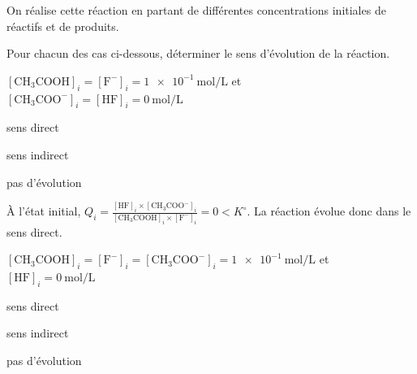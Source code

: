 On réalise cette réaction en partant de différentes concentrations initiales de réactifs et de produits. 

\smallskip
Pour chacun des cas ci-dessous, déterminer le sens d'évolution de la réaction.
\debutEntrainement


\begin{enonce}
$\left[\text{CH}_3\text{COOH}\right]_i=\left[\text{F}^-\right]_i=\SI{1e-1}{\mole\per\liter}$ \qquad et\qquad $\left[\text{CH}_3\text{COO}^-\right]_i=\left[\text{HF}\right]_i=\SI{0}{\mole\per\liter}$
\begin{listeQCM2Colonnes}
	\item sens direct
	\item sens indirect
	\item pas d'évolution
\end{listeQCM2Colonnes}
\end{enonce}

\reponse{\reponseA}

\begin{corrige}
À l'état initial, $Q_i=\frac{\left[\text{HF}\right]_i\times\left[\text{CH}_3\text{COO}^-\right]_i}{\left[\text{CH}_3\text{COOH}\right]_i\times\left[\text{F}^-\right]_i}=0 <K^\circ$. La réaction évolue donc dans le sens direct.
\end{corrige}




\begin{enonce}
$\left[\text{CH}_3\text{COOH}\right]_i=
\left[\text{F}^-\right]_i=
\left[\text{CH}_3\text{COO}^-\right]_i=\SI{1e-1}{\mole\per\liter}$ \qquad et\qquad 
$\left[\text{HF}\right]_i=\SI{0}{\mole\per\liter}$
\begin{listeQCM2Colonnes}
	\item sens direct
	\item sens indirect
	\item pas d'évolution
\end{listeQCM2Colonnes}
\end{enonce}

